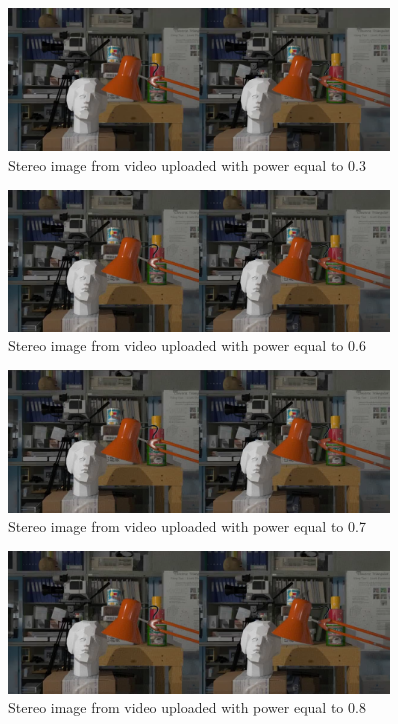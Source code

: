 \begin{figure}[h!]
\centering
\includegraphics[width=0.9\textwidth]{./img/yt_03_gt.png}
\caption{\small{Stereo image from video uploaded with power equal to 0.3 }}
\label{fig:03yt}
\end{figure}
\begin{figure}[h!]
\centering
\includegraphics[width=0.9\textwidth]{./img/yt_06_gt.png}
\caption{\small{Stereo image from video uploaded with power equal to 0.6 }}
\label{fig:06yt}
\end{figure}
\begin{figure}[h!]
\centering
\includegraphics[width=0.9\textwidth]{./img/yt_07_gt.png}
\caption{\small{Stereo image from video uploaded with power equal to 0.7 }}
\label{fig:07yt}
\end{figure}
\begin{figure}[h!]
\centering
\includegraphics[width=0.9\textwidth]{./img/yt_08_gt.png}
\caption{\small{Stereo image from video uploaded with power equal to 0.8 }}
\label{fig:08yt}
\end{figure}
\clearpage

